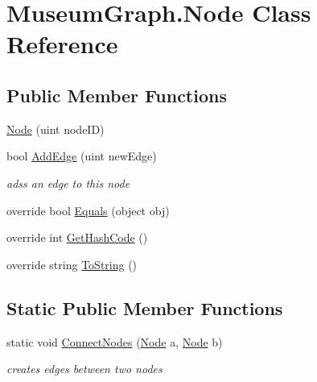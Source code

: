 \hypertarget{class_museum_graph_1_1_node}{}\section{Museum\+Graph.\+Node Class Reference}
\label{class_museum_graph_1_1_node}
\subsection*{Public Member Functions}
\begin{DoxyCompactItemize}
\item 
\mbox{\hyperlink{class_museum_graph_1_1_node_a917a203c77b5aa5e65c7293ba896d2c1}{Node}} (uint node\+ID)
\item 
bool \mbox{\hyperlink{class_museum_graph_1_1_node_adecbc3b471d15c5480d4c13e9502ac27}{Add\+Edge}} (uint new\+Edge)
\begin{DoxyCompactList}\small\item\em adss an edge to this node \end{DoxyCompactList}\item 
override bool \mbox{\hyperlink{class_museum_graph_1_1_node_a341a560512b816a8af059813480ef9da}{Equals}} (object obj)
\item 
override int \mbox{\hyperlink{class_museum_graph_1_1_node_adcc32750b64d61121c1431ffc41b0f8d}{Get\+Hash\+Code}} ()
\item 
override string \mbox{\hyperlink{class_museum_graph_1_1_node_a3bfacc4d5a119f353c81b197ad6a4642}{To\+String}} ()
\end{DoxyCompactItemize}
\subsection*{Static Public Member Functions}
\begin{DoxyCompactItemize}
\item 
static void \mbox{\hyperlink{class_museum_graph_1_1_node_afc85f1140ee37f6365863f34ac3482bc}{Connect\+Nodes}} (\mbox{\hyperlink{class_museum_graph_1_1_node}{Node}} a, \mbox{\hyperlink{class_museum_graph_1_1_node}{Node}} b)
\begin{DoxyCompactList}\small\item\em creates edges between two nodes \end{DoxyCompactList}\end{DoxyCompactItemize}
